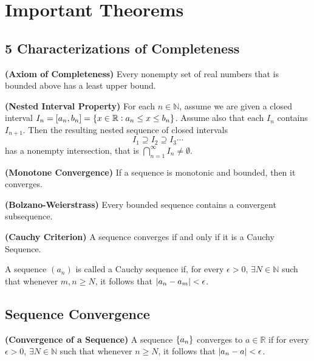 \section{Important Theorems}
\subsection{5 Characterizations of Completeness}
\begin{theorem}
  \textbf{\textup{(Axiom of Completeness)}}
  Every nonempty set of real numbers that is bounded above has a least upper bound. 
\end{theorem}

\begin{theorem}
  \textbf{\textup{(Nested Interval Property)}}
  For each $n\in \mathbb{N}$, assume we are given a closed interval $I_n = \left[a_n, b_n\right] = \{x \in \mathbb{R}:a_n \leq x \leq b_n\}$.
  Assume also that each $I_n$ contains $I_{n+1}$. Then the resulting nested sequence of closed intervals
  \begin{equation*}
    I_1 \supseteq I_2 \supseteq I_3 \cdots
  \end{equation*}
  has a nonempty intersection, that is $\bigcap_{n=1}^\infty I_n \neq \emptyset$.
\end{theorem}

\begin{theorem}
  \textbf{\textup{(Monotone Convergence)}}
  If a sequence is monotonic and bounded, then it converges.
\end{theorem}

\begin{theorem}
  \textbf{\textup{(Bolzano-Weierstrass)}}
  Every bounded sequence contains a convergent subsequence.
\end{theorem}

\begin{theorem}
  \textbf{\textup{(Cauchy Criterion)}}
  A sequence converges if and only if it is a Cauchy Sequence.
  
  A sequence $(a_n)$ is called a Cauchy sequence if, for every $\epsilon > 0$,
  $\exists N \in \mathbb{N}$ such that whenever $m, n \geq N$, it follows that $\abs{a_n - a_m} < \epsilon$.
\end{theorem}

\subsection{Sequence Convergence}
\begin{theorem}
  \textbf{\textup{(Convergence of a Sequence)}}
  A sequence $\left\{a_n\right\}$ converges to $a \in \mathbb{R}$
  if for every $\epsilon > 0$, $\exists N \in \mathbb{N}$ such that 
  whenever $n \geq N$, it follows that $\abs{a_n - a} < \epsilon$.
\end{theorem}

